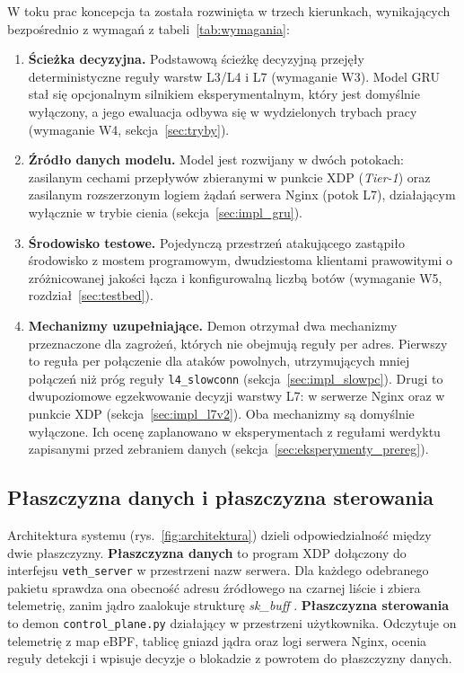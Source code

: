 \documentclass[a4paper,12pt]{article}
\begin{document}
W toku prac koncepcja ta została rozwinięta w trzech kierunkach, wynikających bezpośrednio z wymagań z tabeli~\ref{tab:wymagania}:
\begin{enumerate}
    \item \textbf{Ścieżka decyzyjna.} Podstawową ścieżkę decyzyjną przejęły deterministyczne reguły warstw L3/L4 i L7 (wymaganie W3). Model GRU stał się opcjonalnym silnikiem eksperymentalnym, który jest domyślnie wyłączony, a jego ewaluacja odbywa się w wydzielonych trybach pracy (wymaganie W4, sekcja~\ref{sec:tryby}).
    \item \textbf{Źródło danych modelu.} Model jest rozwijany w dwóch potokach: zasilanym cechami przepływów zbieranymi w punkcie XDP (\textit{Tier-1}) oraz zasilanym rozszerzonym logiem żądań serwera Nginx (potok L7), działającym wyłącznie w trybie cienia (sekcja~\ref{sec:impl_gru}).
    \item \textbf{Środowisko testowe.} Pojedynczą przestrzeń atakującego zastąpiło środowisko z mostem programowym, dwudziestoma klientami prawowitymi o zróżnicowanej jakości łącza i konfigurowalną liczbą botów (wymaganie W5, rozdział~\ref{sec:testbed}).
    \item \textbf{Mechanizmy uzupełniające.} Demon otrzymał dwa mechanizmy przeznaczone dla zagrożeń, których nie obejmują reguły per adres. Pierwszy to reguła per połączenie dla ataków powolnych, utrzymujących mniej połączeń niż próg reguły \texttt{l4\_slowconn} (sekcja~\ref{sec:impl_slowpc}). Drugi to dwupoziomowe egzekwowanie decyzji warstwy L7: w serwerze Nginx oraz w punkcie XDP (sekcja~\ref{sec:impl_l7v2}). Oba mechanizmy są domyślnie wyłączone. Ich ocenę zaplanowano w eksperymentach z regułami werdyktu zapisanymi przed zebraniem danych (sekcja~\ref{sec:eksperymenty_prereg}).
\end{enumerate}

\subsection{Płaszczyzna danych i płaszczyzna sterowania}\label{sec:plaszczyzny}
Architektura systemu (rys.~\ref{fig:architektura}) dzieli odpowiedzialność między dwie płaszczyzny. \textbf{Płaszczyzna danych} to program XDP dołączony do interfejsu \texttt{veth\_server} w przestrzeni nazw serwera. Dla każdego odebranego pakietu sprawdza ona obecność adresu źródłowego na czarnej liście i zbiera telemetrię, zanim jądro zaalokuje strukturę \textit{sk\_buff} \cite{scholz2018performance}. \textbf{Płaszczyzna sterowania} to demon \texttt{control\_plane.py} działający w przestrzeni użytkownika. Odczytuje on telemetrię z map eBPF, tablicę gniazd jądra oraz logi serwera Nginx, ocenia reguły detekcji i wpisuje decyzje o blokadzie z powrotem do płaszczyzny danych.
\end{document}
